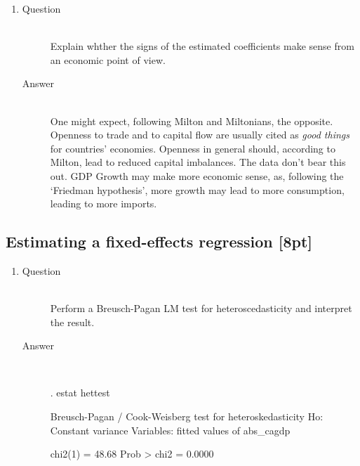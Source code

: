 \documentclass{article}
\begin{document}
  \begin{enumerate}[label=(\alph*)]
    \item 
    \begin{description}
      \item[Question] \hfill \\
      Explain whther the signs of the estimated coefficients make sense from an economic point of view.
      \item[Answer] \hfill \\
      One might expect, following Milton and Miltonians, the opposite. Openness to trade and to capital flow are usually cited as \textit{good things} for countries' economies. Openness in general should, according to Milton, lead to reduced capital imbalances. The data don't bear this out. GDP Growth may make more economic sense, as, following the `Friedman hypothesis', more growth may lead to more consumption, leading to more imports.
    \end{description}
  \end{enumerate}

\subsection{Estimating a fixed-effects regression [8pt]}

  \begin{enumerate}[label=(\alph*)]
    \item 
    \begin{description}
      \item[Question] \hfill \\
      Perform a Breusch-Pagan LM test for heteroscedasticity and interpret the result.
      \item[Answer] \hfill \\
      \begin{CVerbatim}
. estat hettest

Breusch-Pagan / Cook-Weisberg test for heteroskedasticity 
         Ho: Constant variance
         Variables: fitted values of abs_cagdp

         chi2(1)      =    48.68
         Prob > chi2  =   0.0000
      \end{CVerbatim}
    \end{description}
  \end{enumerate}
  
\end{document}
